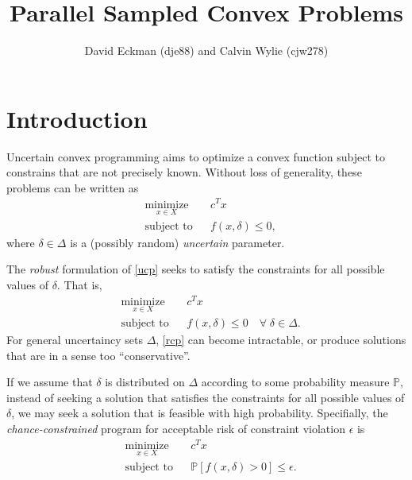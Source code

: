 \documentclass[12pt]{article}
\title{Parallel Sampled Convex Problems}
\author{David Eckman (dje88) and Calvin Wylie (cjw278)}
\begin{document}
\maketitle

\section{Introduction}

Uncertain convex programming aims to optimize a convex function subject to
constrains that are not precisely known.  Without loss of generality, these
problems can be written as
\begin{equation} \label{ucp}
\begin{aligned}
& \underset{x \in X}{\text{minimize}}
& & c^T x \\
& \text{subject to}
& & f(x, \delta) \leq 0,
\end{aligned} \tag{UCP}
\end{equation}
where $\delta \in \Delta$ is a (possibly random) \emph{uncertain} parameter.

The \emph{robust} formulation of \ref{ucp} seeks to satisfy the constraints 
for all possible values of $\delta$.  That is,
\begin{equation} \label{rcp}
\begin{aligned}
& \underset{x \in X}{\text{minimize}}
& & c^T x \\
& \text{subject to}
& & f(x, \delta) \leq 0 \quad \forall \; \delta \in \Delta.
\end{aligned} \tag{RCP}
\end{equation}
For general uncertaincy sets $\Delta$, \ref{rcp} can become intractable, or
produce solutions that are in a sense too ``conservative''.

If we assume that $\delta$ is distributed on $\Delta$ according to some 
probability measure $\mathbb{P}$, instead of seeking a solution that satisfies
the constraints for all possible values of $\delta$, we may seek a solution
that is feasible with high probability.  Specifially, the \emph{chance-constrained}
program for acceptable risk of constraint violation $\epsilon$ is
\begin{equation} \label{ccp}
\begin{aligned}
& \underset{x \in X}{\text{minimize}}
& & c^T x \\
& \text{subject to}
& & \mathbb{P} \left[ f(x, \delta) > 0 \right] \leq \epsilon.
\end{aligned} \tag{CCP$_\epsilon$}
\end{equation}
\end{document}
